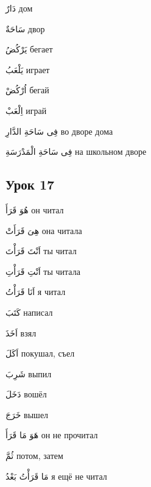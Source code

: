 \documentclass[a5paper]{article}
\newcommand\textstyleDropCaps[1]{#1}
\newcommand\textstyleCaptioncharacters[1]{#1}
\begin{document}
\textstyleCaptioncharacters{دَارٌ }\textstyleDropCaps{дом‎}

\textstyleCaptioncharacters{سَاحَةٌ }\textstyleDropCaps{двор‎}

\textstyleCaptioncharacters{يَرْكُضُ }\textstyleDropCaps{бегает‎}

\textstyleCaptioncharacters{يَلْعَبُ }\textstyleDropCaps{играет‎}

\textstyleCaptioncharacters{اُرْكُضْ }\textstyleDropCaps{бегай‎}

\textstyleCaptioncharacters{اِلْعَبْ }\textstyleDropCaps{играй‎}

\textstyleCaptioncharacters{فِى سَاحَةِ الدَّارِ }\textstyleDropCaps{во дво­ре дома‎}

\textstyleCaptioncharacters{فِى سَاحَةِ الْمَدْرَسَةِ }\textstyleDropCaps{на школьном дворе‎}

\subsection[Урок 17‎]{\textstyleDropCaps{Урок 17‎}}
\textstyleCaptioncharacters{هُوَ قَرَأَ }\textstyleDropCaps{он читал‎}

\textstyleCaptioncharacters{هِىَ قَرَأَتْ }\textstyleDropCaps{она читала‎}

\textstyleCaptioncharacters{اَنْتَ قَرَأْتَ }\textstyleDropCaps{ты читал‎}

\textstyleCaptioncharacters{اَنْتِ قَرَأْتِ }\textstyleDropCaps{ты читала‎}

\textstyleCaptioncharacters{اَنَا قَرَأْتُ }\textstyleDropCaps{я читал‎}

\textstyleCaptioncharacters{كَتَبَ }\textstyleDropCaps{написал‎}

\textstyleCaptioncharacters{اَخَذَ }\textstyleDropCaps{взял‎}

\textstyleCaptioncharacters{اَكَلَ }\textstyleDropCaps{покушал, съел‎}

\textstyleCaptioncharacters{شَرِبَ }\textstyleDropCaps{выпил‎}

\textstyleCaptioncharacters{دَخَلَ }\textstyleDropCaps{вошёл‎}

\textstyleCaptioncharacters{خَرَجَ }\textstyleDropCaps{вышел‎}

\textstyleCaptioncharacters{هَوَ مَا قَرَأَ }\textstyleDropCaps{он не прочи­тал‎}

\textstyleCaptioncharacters{ثُمَّ }\textstyleDropCaps{потом, затем‎}

\textstyleCaptioncharacters{مَا قَرَأْتُ بَعْدُ }\textstyleDropCaps{я ещё не читал‎}
\end{document}
